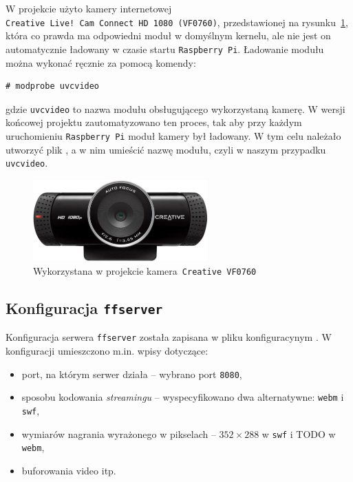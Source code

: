 \documentclass{article}
\begin{document}
W projekcie użyto kamery internetowej \texttt{Creative~Live!~Cam~Connect~HD~1080~(VF0760)}, przedstawionej na rysunku~\ref{fig:creative}, która co prawda ma odpowiedni moduł w domyślnym kernelu, ale nie jest on automatycznie ładowany w czasie startu \texttt{Raspberry~Pi}. Ładowanie modułu można wykonać ręcznie za pomocą komendy:
\begin{verbatim}
# modprobe uvcvideo
\end{verbatim}
gdzie \texttt{uvcvideo} to nazwa modułu obsługującego wykorzystaną kamerę. W wersji końcowej projektu zautomatyzowano ten proces, tak aby przy każdym uruchomieniu \texttt{Raspberry~Pi} moduł kamery był ładowany. W tym celu należało utworzyć plik , a w nim umieścić nazwę modułu, czyli w naszym przypadku \texttt{uvcvideo}.
\begin{figure}[h]
	\centering
	\includegraphics[width=0.6\textwidth]{img/creative}
	\caption{Wykorzystana w projekcie kamera~\texttt{Creative~VF0760}}
	\label{fig:creative}
\end{figure}


\subsection{Konfiguracja \texttt{ffserver}}

Konfiguracja serwera \texttt{ffserver} została zapisana w pliku konfiguracynym . W konfiguracji umieszczono m.in. wpisy dotyczące:
\begin{itemize}
	\item port, na którym serwer działa -- wybrano port \texttt{8080},
	\item sposobu kodowania \emph{streamingu} -- wyspecyfikowano dwa alternatywne: \texttt{webm} i \texttt{swf},
	\item wymiarów nagrania wyrażonego w pikselach -- $352\times288$ w \texttt{swf} i TODO w \texttt{webm},
	\item buforowania video itp.
\end{itemize}
\end{document}
